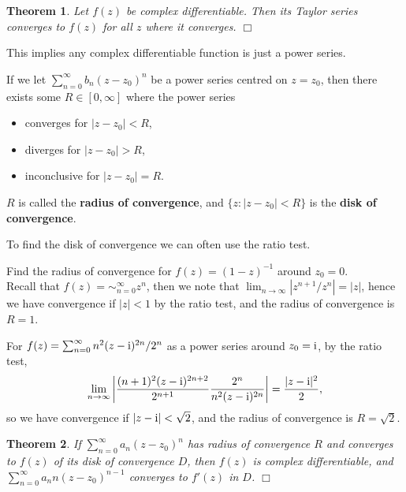 \documentclass[letter-paper]{tufte-book}
\newtheorem{theorem}{\color{pastel-blue}Theorem}[section]
\newenvironment{example}[1][Example]{\begin{trivlist}
\item[\hskip \labelsep {\bfseries #1}]}{\end{trivlist}}
\newcommand{\zi}{{\rm i}}
\newcommand\Def[1]{\textbf{#1}}
\newcommand{\qedwhite}{\hfill \ensuremath{\Box}}
\begin{document}
\begin{theorem}
  Let $f(z)$ be complex differentiable. Then its Taylor series converges to
  $f(z)$ for all $z$ where it converges. \qedwhite
\end{theorem}
This implies any complex differentiable function is just a power series.

If we let $\sum^\infty_{n=0} b_n (z - z_0)^n$ be a power series centred on $z =
z_0$, then there exists some $R \in [0, \infty]$ where the power series
\begin{itemize}
  \item converges for $|z - z_0| < R$,
  \item diverges for $|z - z_0| > R$,
  \item inconclusive for $|z - z_0| = R$.
\end{itemize}
$R$ is called the \Def{radius of convergence}, and $\{z : |z - z_0| < R\}$ is
the \Def{disk of convergence}.

To find the disk of convergence we can often use the ratio test.

\begin{example}
  Find the radius of convergence for $f(z) = (1 - z)^{-1}$ around $z_0 = 0$.\\
  
  Recall that $f(z) = \sim^\infty_{n=0} z^n$, then we note that $\lim_{n \to
  \infty} |z^{n+1} / z^n| = |z|$, hence we have convergence if $|z| < 1$ by the
  ratio test, and the radius of convergence is $R = 1$.
\end{example}

\begin{example}
  For $f(z) = \sum^\infty_{n=0} n^2 (z - \zi)^{2n} / 2^n$ as a power series around
  $z_0 = \zi$, by the ratio test,
  \begin{equation*}
    \lim_{n \to \infty} \left|\frac{(n+1)^2 (z - \zi)^{2n+2}}{2^{n+1}}\frac{2^n}{n^2 (z-\zi)^{2n}}\right| = \frac{|z - \zi|^2}{2},
  \end{equation*}
  so we have convergence if $|z - \zi| < \sqrt{2}$, and the radius of
  convergence is $R = \sqrt{2}$.
\end{example}

\begin{theorem}
  If $\sum^\infty_{n=0} a_n (z - z_0)^n$ has radius of convergence $R$ and
  converges to $f(z)$ of its disk of convergence $D$, then $f(z)$ is complex
  differentiable, and $\sum^\infty_{n=0} a_n n (z - z_0)^{n-1}$ converges to
  $f'(z)$ in $D$. \qedwhite
\end{theorem}
\end{document}
